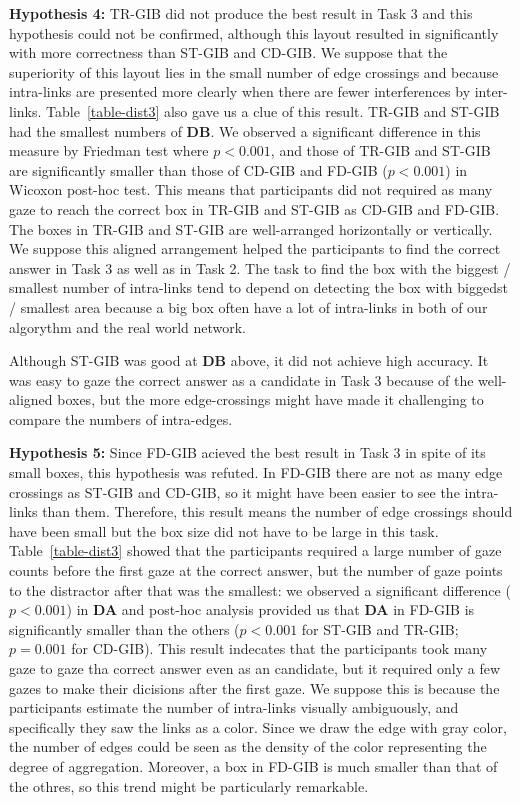 \documentclass{vgtc}                          %
\begin{document}
{\bf Hypothesis 4:} TR-GIB did not produce the best result in Task 3 and this hypothesis could not be confirmed, although this layout resulted in significantly with more correctness than ST-GIB and CD-GIB.
We suppose that the superiority of this layout lies in the small number of edge crossings and because intra-links are presented more clearly when there are fewer interferences by inter-links.
Table~\ref{table-dist3} also gave us a clue of this result.
TR-GIB and ST-GIB had the smallest numbers of {\bf DB}.
We observed a significant difference in this measure by Friedman test where $p<0.001$, and those of TR-GIB and ST-GIB are significantly smaller than those of CD-GIB and FD-GIB ($p<0.001$) in Wicoxon post-hoc test.
This means that participants did not required as many gaze to reach the correct box in TR-GIB and ST-GIB as CD-GIB and FD-GIB.
The boxes in TR-GIB and ST-GIB are well-arranged horizontally or vertically.
We suppose this aligned arrangement helped the participants to find the correct answer in Task 3 as well as in Task 2.
The task to find the box with the biggest / smallest number of intra-links tend to depend on detecting the box with biggedst / smallest area because a big box often have a lot of intra-links in both of our algorythm and the real world network.

Although ST-GIB was good at {\bf DB} above, it did not achieve high accuracy.
It was easy to gaze the correct answer as a candidate in Task 3 because of the well-aligned boxes, but the more edge-crossings might have made it challenging to compare the numbers of intra-edges.


{\bf Hypothesis 5:} Since FD-GIB acieved the best result in Task 3 in spite of its small boxes, this hypothesis was refuted. In FD-GIB there are not as many edge crossings as ST-GIB and CD-GIB, so it might have been easier to see the intra-links than them. Therefore, this result means the number of edge crossings should have been small but the box size did not have to be large in this task.
Table~\ref{table-dist3} showed that the participants required a large number of gaze counts before the first gaze at the correct answer, but the number of gaze points to the distractor after that was the smallest: we observed a significant difference ($p<0.001$) in {\bf DA} and post-hoc analysis provided us that {\bf DA} in FD-GIB is significantly smaller than the others ($p<0.001$ for ST-GIB and TR-GIB; $p=0.001$ for CD-GIB).
This result indecates that the participants took many gaze to gaze tha correct answer even as an candidate, but it required only a few gazes to make their dicisions after the first gaze.
We suppose this is because the participants estimate the number of intra-links visually ambiguously, and specifically they saw the links as a color.
Since we draw the edge with gray color, the number of edges could be seen as the density of the color representing the degree of aggregation.
Moreover, a box in FD-GIB is much smaller than that of the othres, so this trend might be particularly remarkable.
\end{document}
